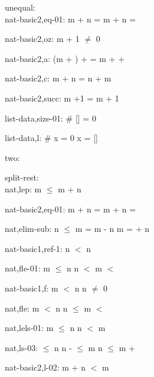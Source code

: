 \documentclass[a4paper]{article}
\begin{document}
\raggedright
              
unequal:\\ nat-basic2,eq-01: 
 \Fol m + n = m +  \Equiv n = 



nat-basic2,oz: 
 \Fol m + 1 $\neq$ 0



nat-basic2,a: 
 \Fol (m + ) +  = m +  + 



nat-basic2,c: 
 \Fol m + n = n + m



nat-basic2,succ: 
 \Fol m +1 = m + 1



list-data,size-01: 
 \Fol \# [] = 0



list-data,l: 
 \Fol \# x = 0 \Equiv x = []



\bigskip

two:\\ 

\bigskip

split-rest:\\ nat,lep: 
 \Fol m $\le$ m + n



nat-basic2,eq-01: 
 \Fol m + n = m +  \Equiv n = 



nat,elim-sub: 
n $\le$ m
 \Fol {} = m - n \Equiv m =  + n



nat-basic1,ref-1: 
 \Fol \Not n $<$ n



nat,fle-01: 
 \Fol m $\le$ n \And n $<$  \Imp m $<$ 



nat-basic1,f: 
 \Fol m $<$ n \Imp n $\neq$ 0



nat,fle: 
 \Fol m $<$ n \And n $\le$  \Imp m $<$ 



nat,lels-01: 
 \Fol \Not m $\le$ n \Equiv n $<$ m



nat,ls-03: 
 $\le$ n
 \Fol n -  $\le$ m \Equiv n $\le$ m + 



nat-basic2,l-02: 
 \Fol \Not m + n $<$ m
\end{document}
